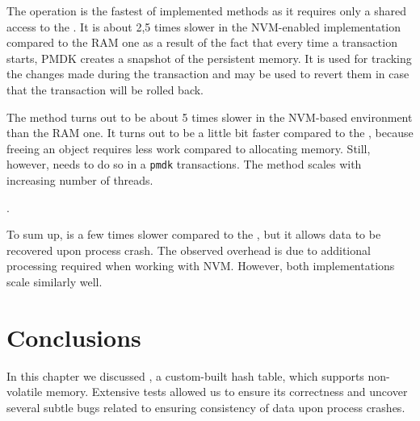     The \getMethod operation is the fastest of implemented methods as it requires only a shared access to the \internalHashMap. 
    It is about 2,5 times slower in the NVM-enabled implementation compared to the RAM one as a result of the fact that every time a transaction starts, PMDK creates a snapshot of the persistent memory.
    It is used for tracking the changes made during the transaction and may be used to revert them in case that the transaction will be rolled back.
    
    
    The \removeMethod method turns out to be about 5 times slower in the NVM-based environment than the RAM one.
    It turns out to be a little bit faster compared to the \insertMethod, because freeing an object requires less work compared to allocating memory.
    Still, however, \removeMethod needs to do so in a \texttt{pmdk} transactions.
    The method scales with increasing number of threads.
    
    \noindent {}. %
    
    To sum up, \PHT is a few times slower compared to the \StandardHashMap, but it allows data to be recovered upon process crash. 
    The observed overhead is due to additional processing required when working with NVM. 
    However, both implementations scale similarly well. 
            
\section{Conclusions}
        
    In this chapter we discussed \PHT, a custom-built hash table, which supports non-volatile memory. 
    Extensive tests allowed us to ensure its correctness and uncover several subtle bugs related to ensuring consistency of data upon process crashes.
    
